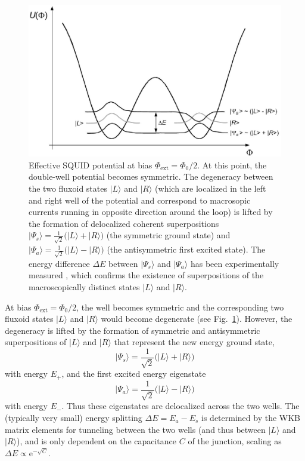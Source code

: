 \documentclass[twocolumn,aps,floatfix,amsmath,amssymb,showpacs,nofootinbib]{revtex4}
\newcommand{\be}{\begin{equation}} \newcommand{\ee}{\end{equation}}
\newcommand{\ket}[1]{\ensuremath{|{#1\rangle}}}
\newcommand{\e}{\ensuremath{\mathrm{e}}}
\begin{document}
\begin{figure}
\begin{center}
\includegraphics[scale=0.4]{squid-pot-n.eps}
\end{center}
\caption[Effective SQUID potential at bias $\Phi_\text{ext} = \Phi_0/2$]{\label{fig:squid-pot}
  Effective SQUID potential at bias $\Phi_\text{ext} = \Phi_0/2$. At
  this point, the double-well potential becomes symmetric. The
  degeneracy between the two fluxoid states $\ket{L}$ and $\ket{R}$
  (which are localized in the left and right well of the potential and
  correspond to macrosopic currents running in opposite direction
  around the loop) is lifted by the formation of delocalized coherent
  superpositions $\ket{\Psi_s} = \frac{1}{\sqrt{2}} \bigl( \ket{L} +
  \ket{R} \bigr)$ (the symmetric ground state) and $\ket{\Psi_a} =
  \frac{1}{\sqrt{2}} \bigl( \ket{L} - \ket{R} \bigr)$ (the
  antisymmetric first excited state).  The energy difference $\Delta
  E$ between $\ket{\Psi_s}$ and $\ket{\Psi_a}$ has been experimentally
  measured \cite{Friedman:2000:rr,Wal:2000:om}, which confirms the
  existence of superpositions of the macroscopically distinct states
  $\ket{L}$ and $\ket{R}$.}
\end{figure}


At bias $\Phi_\text{ext} = \Phi_0/2$, the well becomes symmetric and
the corresponding two fluxoid states $\ket{L}$ and $\ket{R}$ would
become degenerate (see Fig.~\ref{fig:squid-pot}).  However, the
degeneracy is lifted by the formation of symmetric and antisymmetric
superpositions of $\ket{L}$ and $\ket{R}$ that represent the new
energy ground state,
%
\be
\ket{\Psi_s} = \frac{1}{\sqrt{2}} \bigl( \ket{L} + \ket{R} \bigr)
\ee
%
with energy $E_+$, and the first excited energy eigenstate
%
\be
\ket{\Psi_a} = \frac{1}{\sqrt{2}} \bigl( \ket{L} - \ket{R} \bigr)
\ee
%
with energy $E_-$.  Thus these eigenstates are delocalized across the
two wells. The (typically very small) energy splitting $\Delta E = E_a
- E_s$ is determined by the WKB matrix elements for tunneling between
the two wells (and thus between $\ket{L}$ and $\ket{R}$), and is only
dependent on the capacitance $C$ of the junction, scaling as $\Delta E
\propto \e^{-\sqrt{C}}$.    
\end{document}
